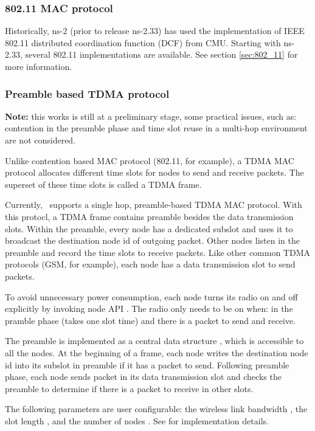 \subsubsection{802.11 MAC protocol}
\label{sec:802_11_brief}

  Historically, ns-2 (prior to release ns-2.33)
  has used the implementation of IEEE 802.11 distributed coordination 
  function (DCF) from CMU. Starting with ns-2.33, several 802.11 
  implementations are available.  See section \ref{sec:802_11} for
  more information.

\subsubsection{Preamble based TDMA protocol}
\label{sec:tdma}
{\bf Note:} this works is still at a preliminary stage,
  some practical issues, such as:
  contention in the preamble phase and 
  time slot reuse in a multi-hop environment are not considered.

Unlike contention based MAC protocol (802.11, for example), 
  a TDMA MAC protocol allocates different time slots for nodes to 
  send and receive packets.
The superset of these time slots is called a TDMA frame.

Currently, \ns\ supports a single hop, 
  preamble-based TDMA MAC protocol.
With this protocl,
  a TDMA frame contains preamble besides the data transmission slots.
Within the preamble,
  every node has a dedicated subslot and
  uses it to broadcast the destination node id of outgoing packet.
Other nodes listen in the preamble and record 
  the time slots to receive packets.
Like other common TDMA protocols (GSM, for example),
  each node has a data transmission slot to send packets.

To avoid unnecessary power consumption,
  each node turns its radio on and off explicitly
  by invoking node API .
The radio only needs to be on when:
  in the pramble phase (takes one slot time) and
  there is a packet to send and receive.

The preamble is implemented as a central data structure
  ,
  which is accessible to all the nodes.
At the beginning of a frame,
  each node writes the destination node id into
  its subslot in preamble if it has a packet to send.
Following preamble phase,
  each node sends packet in its data transmission slot and
  checks the preamble to determine if 
  there is a packet to receive in other slots.

The following parameters are user configurable:
 the wireless link bandwidth ,  
  the slot length , 
  and the number of nodes .
See  for implementation details.

